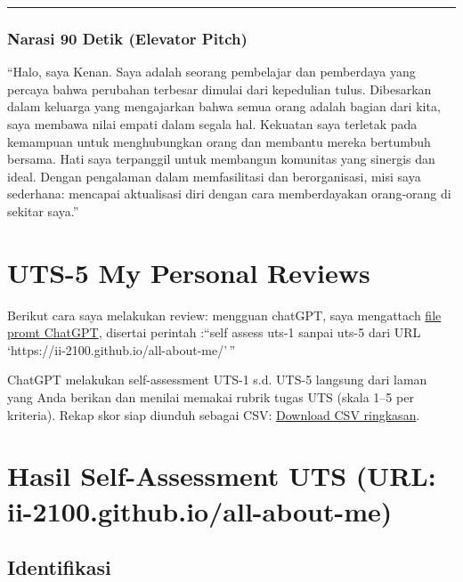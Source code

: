 \documentclass[
  letterpaper,
  DIV=11,
  numbers=noendperiod]{scrreprt}
\begin{document}
\begin{center}\rule{0.5\linewidth}{0.5pt}\end{center}

\subsection{Narasi 90 Detik (Elevator
Pitch)}\label{narasi-90-detik-elevator-pitch}

``Halo, saya Kenan. Saya adalah seorang pembelajar dan pemberdaya yang
percaya bahwa perubahan terbesar dimulai dari kepedulian tulus.
Dibesarkan dalam keluarga yang mengajarkan bahwa semua orang adalah
bagian dari kita, saya membawa nilai empati dalam segala hal. Kekuatan
saya terletak pada kemampuan untuk menghubungkan orang dan membantu
mereka bertumbuh bersama. Hati saya terpanggil untuk membangun komunitas
yang sinergis dan ideal. Dengan pengalaman dalam memfasilitasi dan
berorganisasi, misi saya sederhana: mencapai aktualisasi diri dengan
cara memberdayakan orang-orang di sekitar saya.''


\chapter{UTS-5 My Personal Reviews}\label{uts-5-my-personal-reviews}

Berikut cara saya melakukan review: mengguan chatGPT, saya mengattach
\href{skor_uts.pdf}{file promt ChatGPT}, disertai perintah :``self
assess uts-1 sanpai uts-5 dari URL
`https://ii-2100.github.io/all-about-me/'\,''

ChatGPT melakukan self-assessment UTS-1 s.d. UTS-5 langsung dari laman
yang Anda berikan dan menilai memakai rubrik tugas UTS (skala 1--5 per
kriteria). Rekap skor siap diunduh sebagai CSV:
\href{sandbox:/mnt/data/UTS_self_assessment.csv}{Download CSV
ringkasan}.


\chapter{Hasil Self-Assessment UTS (URL:
ii-2100.github.io/all-about-me)}\label{hasil-self-assessment-uts-url-ii-2100.github.ioall-about-me}

\section{Identifikasi}\label{identifikasi}
\end{document}
